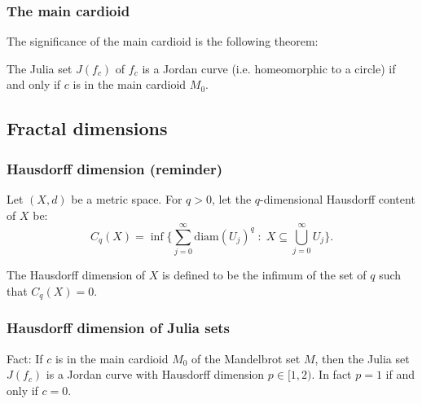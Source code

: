 \documentclass{beamer} %
\theoremstyle{definition} %
\newcommand{\Cplx}{\mathbb{C}}
\begin{document}
\begin{frame}\frametitle{The main cardioid}
    The significance of the main cardioid is the following theorem:
    \begin{theorem}
        The Julia set $J(f_c)$ of $f_c$ is a Jordan curve (i.e. homeomorphic to a circle) if and only if $c$ is in the main cardioid $M_0$.
    \end{theorem}
\end{frame}


\subsection{Fractal dimensions}
\begin{frame}\frametitle{Hausdorff dimension (reminder)}
    Let $(X,d)$ be a metric space. For $q > 0$, let the $q$-dimensional Hausdorff content of $X$ be:
    \begin{equation*}
        C_q(X) = \inf\{\sum_{j=0}^\infty \mathrm{diam}(U_j)^q\;:\;X \subseteq \bigcup_{j =0}^\infty U_j\}.
    \end{equation*}
    
    The Hausdorff dimension of $X$ is defined to be the infimum of the set of $q$ such that $C_q(X) = 0$.
\end{frame}
% 

\begin{frame}\frametitle{Hausdorff dimension of Julia sets}
    Fact: If $c$ is in the main cardioid $M_0$ of the Mandelbrot set $M$, then the Julia set $J(f_c)$ is a Jordan curve
    with Hausdorff dimension $p \in [1,2)$. In fact $p = 1$ if and only if $c = 0$.
\end{frame}
\end{document}
